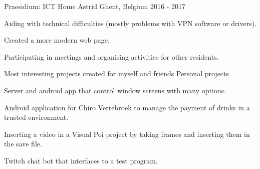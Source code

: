 


\begin{cventries}


\cventry
{Praesidium: ICT} %
{Home Astrid} %
{Ghent, Belgium} %
{2016 - 2017} %
{ %
\begin{cvitems}
\item {Aiding with technical difficulties (mostly problems with VPN software or drivers).}
\item {Created a more modern web page.}
\item {Participating in meetings and organising activities for other residents.}
\end{cvitems}
}


\cventry
{Most interesting projects created for myself and friends}
{Personal projects}
{}
{}
{ %
\begin{cvitems}
\item {Server and android app that control window screens with many options.}
\item {Android application for Chiro Verrebroek to manage the payment of drinks in a trusted environment.}
\item {Inserting a video in a Visual Poi project by taking frames and inserting them in the save file.}
\item {Twitch chat bot that interfaces to a test program.}
\end{cvitems}
}


\end{cventries}